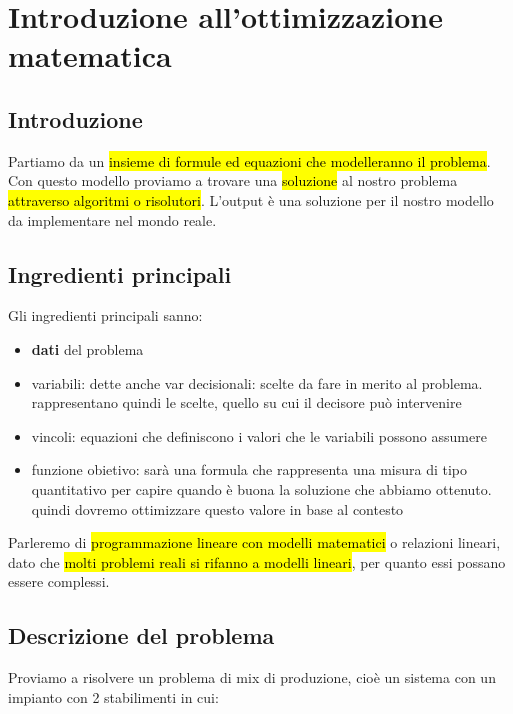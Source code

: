\newpage
\section{Introduzione all'ottimizzazione matematica}

\subsection{Introduzione}

Partiamo da un \hl{insieme di formule ed equazioni che modelleranno il problema}. Con questo modello proviamo a trovare una \hl{soluzione} al nostro problema \hl{attraverso algoritmi o risolutori}. L'output è una soluzione per il nostro modello da implementare nel mondo reale.


\subsection{Ingredienti principali}

Gli ingredienti principali sanno:

\begin{itemize}
	\item \textbf{dati} del problema
	\item variabili: dette anche var decisionali: scelte da fare in merito al problema. rappresentano quindi le scelte, quello su cui il decisore può intervenire
	\item vincoli: equazioni che definiscono i valori che le variabili possono assumere
	\item funzione obietivo: sarà una formula che rappresenta una misura di tipo quantitativo per capire quando è buona la soluzione che abbiamo ottenuto. quindi dovremo ottimizzare questo valore in base al contesto
\end{itemize}


Parleremo di \hl{programmazione lineare con modelli matematici} o relazioni lineari, dato che \hl{molti problemi reali si rifanno a modelli lineari}, per quanto essi possano essere complessi.


\subsection{Descrizione del problema}

Proviamo a risolvere un problema di mix di produzione, cioè un sistema con un impianto con 2 stabilimenti in cui:

